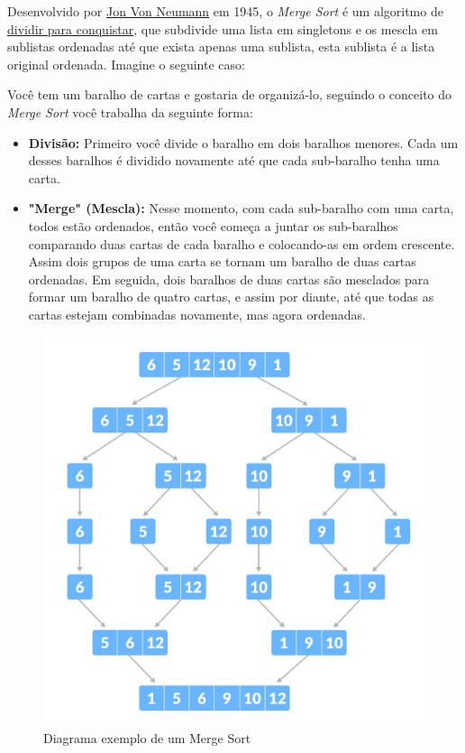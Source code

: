 \label{sec:merge-sort-teo}

Desenvolvido por \href{https://en.wikipedia.org/wiki/John_von_Neumann}{Jon Von Neumann} em 1945, o \textit{Merge Sort} é um algoritmo de \href{https://en.wikipedia.org/wiki/Divide-and-conquer_algorithm}{dividir para conquistar}, que subdivide uma lista em singletons e os mescla em sublistas ordenadas até que exista apenas uma sublista, esta sublista é a lista original ordenada. Imagine o seguinte caso:

Você tem um baralho de cartas e gostaria de organizá-lo, seguindo o conceito do \textit{Merge Sort} você trabalha da seguinte forma:
\begin{itemize}
	\item \textbf{Divisão:} Primeiro você divide o baralho em dois baralhos menores. Cada um desses baralhos é dividido novamente até que cada sub-baralho tenha uma carta.
	\item \textbf{"Merge" (Mescla):} Nesse momento, com cada sub-baralho com uma carta, todos estão ordenados, então você começa a juntar os sub-baralhos comparando duas cartas de cada baralho e colocando-as em ordem crescente. Assim dois grupos de uma carta se tornam um baralho de duas cartas ordenadas. Em seguida, dois baralhos de duas cartas são mesclados para formar um baralho de quatro cartas, e assim por diante, até que todas as cartas estejam combinadas novamente, mas agora ordenadas.
\end{itemize}
\begin{figure}[!ht]
	\centering
	\includegraphics[scale=0.4]{figures/merge-sort-example_0.png}
	\caption{Diagrama exemplo de um Merge Sort}
	\label{fig:merge_sort_example_0}
\end{figure}

